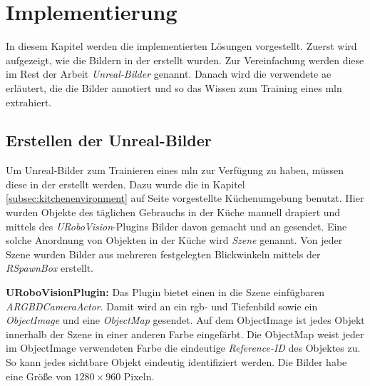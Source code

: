 \graphicspath{{./images/}}      
\def\CHAPTERONE{./chapters/Chapter-1} 

\chapter{Implementierung}
\label{chap:implementation}
%	

In diesem Kapitel werden die implementierten Lösungen vorgestellt. Zuerst wird aufgezeigt, wie die Bildern in der \unreal erstellt wurden. Zur Vereinfachung werden diese im Rest der Arbeit \textit{Unreal-Bilder} genannt. Danach wird die verwendete \gls{ae} erläutert, die die Bilder annotiert und so das Wissen zum  Training eines \gls{mln} extrahiert. \par

\section{Erstellen der Unreal-Bilder}
\label{sec:takingpics}

Um Unreal-Bilder zum Trainieren eines \gls{mln} zur Verfügung zu haben, müssen diese in der \unreal erstellt werden. Dazu wurde die in Kapitel \ref{subsec:kitchenenvironment} auf Seite \pageref{subsec:kitchenenvironment} vorgestellte Küchenumgebung benutzt. Hier wurden Objekte des täglichen Gebrauchs in der Küche manuell drapiert und mittels des \textit{URoboVision}-Plugins Bilder davon gemacht und an \robosherlock gesendet. Eine solche Anordnung von Objekten in der Küche wird \textit{Szene} genannt. Von jeder Szene wurden Bilder aus mehreren festgelegten Blickwinkeln mittels der \textit{RSpawnBox} erstellt. \par 

\textbf{URoboVisionPlugin:} Das Plugin bietet einen in die Szene einfügbaren \textit{ARGBDCameraActor}. Damit wird an \robosherlock ein \gls{rgb}- und Tiefenbild sowie ein \textit{ObjectImage} und eine \textit{ObjectMap} gesendet. Auf dem ObjectImage ist jedes Objekt innerhalb der Szene in einer anderen Farbe eingefärbt. Die ObjectMap weist jeder im ObjectImage verwendeten Farbe die eindeutige \textit{Reference-ID} des Objektes zu. So kann jedes sichtbare Objekt eindeutig identifiziert werden. Die Bilder habe eine Größe von $1280 \times 960$ Pixeln. \par 

